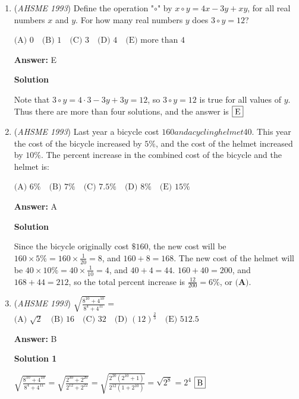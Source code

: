\begin{enumerate}
 $\frac{15^{15}}{3^{15}} \Rightarrow (\frac{15}{3})^{15} \Rightarrow 5^{15}$
$\fbox{E}$



	\item (\textit{AHSME 1993}) Define the operation "$\circ$" by $x\circ y=4x-3y+xy$, for all real numbers $x$ and $y$. For how many real numbers $y$ does $3\circ y=12$?


 $\text{(A) } 0\quad \text{(B) } 1\quad \text{(C) } 3\quad \text{(D) } 4\quad \text{(E) more than 4}$

 \textbf{Answer: }E



\textbf{Solution}

Note that $3 \circ y = 4 \cdot 3 - 3y + 3y = 12$, so $3 \circ y = 12$ is true for all values of $y$. Thus there are more than four solutions, and the answer is $\fbox{E}$



	\item (\textit{AHSME 1993}) Last year a bicycle cost $160 and a cycling helmet $40. This year the cost of the bicycle increased by $5\%$, and the cost of the helmet increased by $10\%$. The percent increase in the combined cost of the bicycle and the helmet is:


 $\text{(A) } 6\%\quad \text{(B) } 7\%\quad \text{(C) } 7.5\%\quad \text{(D) } 8\%\quad \text{(E) } 15\%$

 \textbf{Answer: }A



\textbf{Solution}

Since the bicycle originally cost $\$160$, the new cost will be $160 \times 5\% = 160 \times \frac{1}{20} = 8$, and $160 + 8 = 168$. The new cost of the helmet will be $40 \times 10\% = 40 \times \frac{1}{10} = 4$, and $40 + 4 = 44$. $160 + 40 = 200$, and $168 + 44 = 212$, so the total percent increase is $\frac{12}{200} = 6\%$, or $\textbf{(A)}$.

 


	\item (\textit{AHSME 1993}) $\sqrt{\frac{8^{10}+4^{10}}{8^4+4^{11}}}=$
$\text{(A) } \sqrt{2}\quad \text{(B) } 16\quad \text{(C) } 32\quad \text{(D) } (12)^{\frac{2}{3}}\quad \text{(E) } 512.5$

 \textbf{Answer: }B



\textbf{Solution 1}

$\sqrt{\frac{ 8^{10}+4^{10} }{8^4 + 4^{11}}} = \sqrt{\frac{2^{30}+2^{20}}{2^{12}+2^{22}}}= \sqrt{\frac{2^{20}(2^{10}+1)}{2^{12}(1+2^{10})}} = \sqrt{2^8} = 2^4$
$\fbox{B}$





\end{enumerate}
